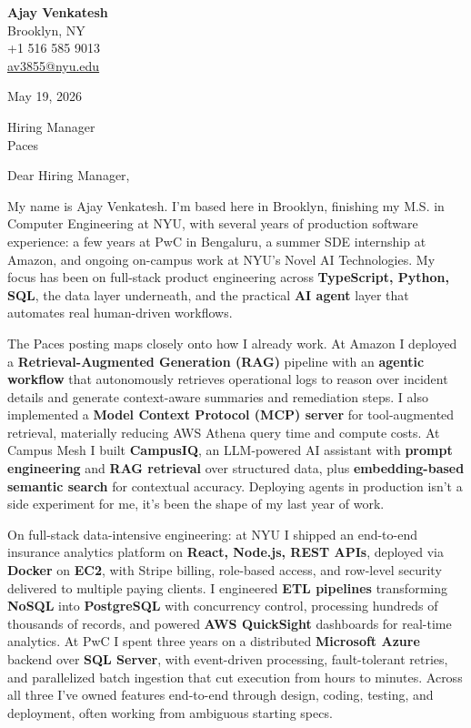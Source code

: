\documentclass[letterpaper,11pt]{article}
\begin{document}
\begin{flushleft}
\textbf{\large Ajay Venkatesh} \\
Brooklyn, NY \\
+1 516 585 9013 \\
\href{mailto:av3855@nyu.edu}{av3855@nyu.edu}
\end{flushleft}

\vspace{10pt}

May 19, 2026

\vspace{6pt}

Hiring Manager \\
Paces

\vspace{10pt}

Dear Hiring Manager,

My name is Ajay Venkatesh. I'm based here in Brooklyn, finishing my M.S. in Computer Engineering at NYU, with several years of production software experience: a few years at PwC in Bengaluru, a summer SDE internship at Amazon, and ongoing on-campus work at NYU's Novel AI Technologies. My focus has been on full-stack product engineering across \textbf{TypeScript, Python, SQL}, the data layer underneath, and the practical \textbf{AI agent} layer that automates real human-driven workflows.

The Paces posting maps closely onto how I already work. At Amazon I deployed a \textbf{Retrieval-Augmented Generation (RAG)} pipeline with an \textbf{agentic workflow} that autonomously retrieves operational logs to reason over incident details and generate context-aware summaries and remediation steps. I also implemented a \textbf{Model Context Protocol (MCP) server} for tool-augmented retrieval, materially reducing AWS Athena query time and compute costs. At Campus Mesh I built \textbf{CampusIQ}, an LLM-powered AI assistant with \textbf{prompt engineering} and \textbf{RAG retrieval} over structured data, plus \textbf{embedding-based semantic search} for contextual accuracy. Deploying agents in production isn't a side experiment for me, it's been the shape of my last year of work.

On full-stack data-intensive engineering: at NYU I shipped an end-to-end insurance analytics platform on \textbf{React, Node.js, REST APIs}, deployed via \textbf{Docker} on \textbf{EC2}, with Stripe billing, role-based access, and row-level security delivered to multiple paying clients. I engineered \textbf{ETL pipelines} transforming \textbf{NoSQL} into \textbf{PostgreSQL} with concurrency control, processing hundreds of thousands of records, and powered \textbf{AWS QuickSight} dashboards for real-time analytics. At PwC I spent three years on a distributed \textbf{Microsoft Azure} backend over \textbf{SQL Server}, with event-driven processing, fault-tolerant retries, and parallelized batch ingestion that cut execution from hours to minutes. Across all three I've owned features end-to-end through design, coding, testing, and deployment, often working from ambiguous starting specs.
\end{document}
